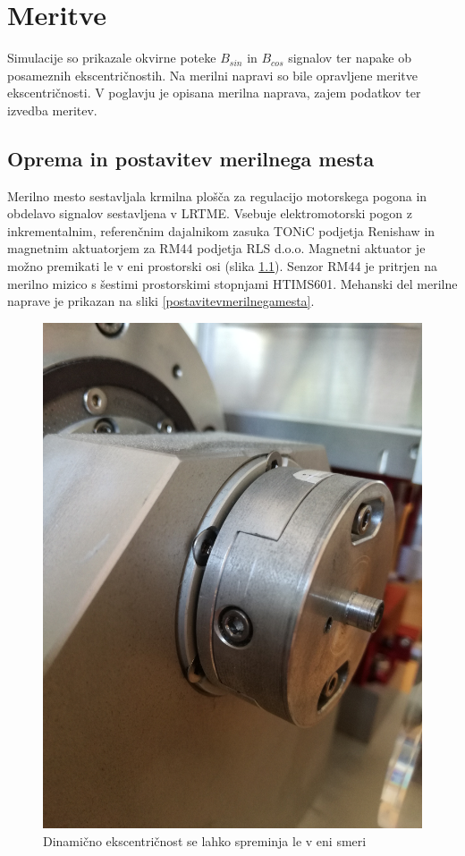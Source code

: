 \chapter{Meritve}
Simulacije so prikazale okvirne poteke $B_{sin}$ in $B_{cos}$ signalov ter napake  ob posameznih ekscentričnostih.
Na merilni napravi so bile opravljene meritve ekscentričnosti. V poglavju je opisana merilna naprava, zajem podatkov ter izvedba meritev.
\section{Oprema in postavitev merilnega mesta}
Merilno mesto sestavljala krmilna plošča za regulacijo motorskega pogona in obdelavo signalov sestavljena v LRTME.
Vsebuje elektromotorski pogon z inkrementalnim, referenčnim dajalnikom zasuka TONiC podjetja Renishaw in magnetnim aktuatorjem za RM44 podjetja RLS  d.o.o.
Magnetni aktuator je možno premikati le v eni prostorski osi (slika \ref{premikanjeMagneta}).
Senzor RM44 je pritrjen na merilno mizico s šestimi prostorskimi stopnjami HTIMS601.
Mehanski del merilne naprave je prikazan na sliki \ref{postavitevmerilnegamesta}.
\begin{figure}[ht]
	\centering
	\includegraphics[width=0.4\columnwidth]{./Slike/premikanjeMagneta.jpg}
	\caption{Dinamično ekscentričnost se lahko spreminja le v eni smeri}
	\label{premikanjeMagneta}
\end{figure}
